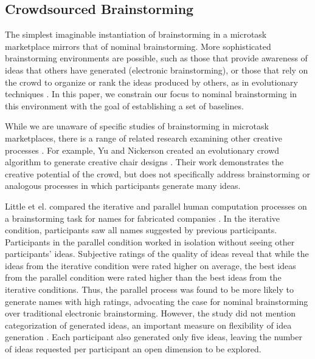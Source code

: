 \subsection{Crowdsourced Brainstorming}
The simplest imaginable instantiation of brainstorming in a microtask marketplace mirrors that of nominal brainstorming. More sophisticated brainstorming environments are possible, such as those that provide awareness of ideas that others have generated (electronic brainstorming), or those that rely on the crowd to organize or rank the ideas produced by others, as in evolutionary techniques \cite{yu_cooks_2011}.
In this paper, we constrain our focus to nominal brainstorming in this environment with the goal of establishing a set of baselines.

While we are unaware of specific studies of brainstorming in microtask marketplaces, there is a range of related research examining other creative processes \cite{lewis2011affective, kittur2011crowdforge, Zhang:2012:HCT:2207676.2207708}. For example, Yu and Nickerson created an evolutionary crowd algorithm to generate creative chair designs \cite{yu_cooks_2011}. Their work demonstrates the creative potential of the crowd, but does not specifically address brainstorming or analogous processes in which participants generate many ideas. 

Little et el. compared the iterative and parallel human computation processes on a brainstorming task for names for fabricated companies \cite{little2010exploring}. In the iterative condition, participants saw all names suggested by previous participants. Participants in the parallel condition worked in isolation without seeing other participants' ideas. Subjective ratings of the quality of ideas reveal that while the ideas from the iterative condition were rated higher on average, the best ideas from the parallel condition were rated higher than the best ideas from the iterative conditions. Thus, the parallel process was found to be more likely to generate names with high ratings, advocating the case for nominal brainstorming over traditional electronic brainstorming. However, the study did not mention categorization of generated ideas, an important measure on flexibility of idea generation \cite{lewis2011affective, nijstad_how_2006, finke1992creative, shah2003metrics}. Each participant also generated only five ideas, leaving the number of ideas requested per participant an open dimension to be explored.

